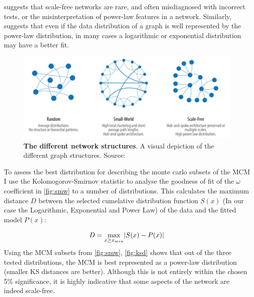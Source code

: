 \cite{scalefreebad} suggests that scale-free networks are rare, and often misdiagnosed with incorrect tests, or the misinterpretation of power-law features in a network. Similarly, \cite{plexp} suggests that even if the data distribution of a graph is well represented by the power-law distribution, in many cases a logarithmic or exponential distribution may have a better fit. 

\begin{figure}[H]
     \centering
         \includegraphics[width=.8\textwidth]{figures_c3/graphstyles.png}
        \caption{\textbf{The different network structures}. A visual depiction of the different graph structures. Source: \cite{neoj4}}
        \label{fig:gstructure}
\end{figure}

To assess the best distribution for describing the monte carlo subsets of the MCM I use the Kolomogorov-Smirnov statistic \citep{ks} to analyse the goodness of fit of the $\omega$ coefficient in \autoref{fig:smw} to a number of distributions. This calculates the maximum distance $D$ between the selected cumelative distribution function $S(x)$ (In our case the Logarithmic, Exponential and Power Law) of the data and the fitted model $P(x)$:

\begin{equation}
D = \smash{\displaystyle\max_{x \ge x_{min}}} |{S(x) - P(x)}|
\end{equation}

Using the MCM subsets from \autoref{fig:smw}, \autoref{fig:ksd} shows that out of the three tested distributions, the MCM is best represented as a power-law distribution (smaller KS distances are better). Although this is not entirely within the chosen 5\% significance, it is highly indicative that some aspects of the network are indeed scale-free.

